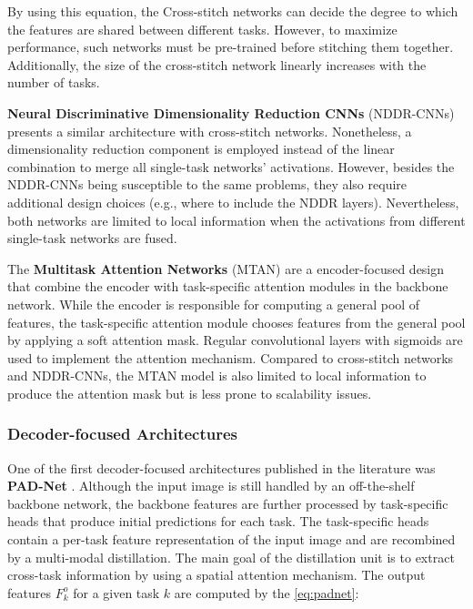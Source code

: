 By using this equation, the Cross-stitch networks can decide the degree to which the features are shared between different tasks. However, to maximize performance, such networks must be pre-trained before stitching them together. Additionally, the size of the cross-stitch network linearly increases with the number of tasks. 

\textbf{Neural Discriminative Dimensionality Reduction CNNs} (NDDR-CNNs) \citep{gao2019nddr} presents a similar architecture with cross-stitch networks. Nonetheless, a dimensionality reduction component is employed instead of the linear combination to merge all single-task networks' activations. However, besides the NDDR-CNNs being susceptible to the same problems, they also require additional design choices (e.g., where to include the NDDR layers). Nevertheless, both networks are limited to local information when the activations from different single-task networks are fused.

The \textbf{Multitask Attention Networks} (MTAN) \citep{liu2019end} are a encoder-focused design that combine the encoder with task-specific attention modules in the backbone network. While the encoder is responsible for computing a general pool of features, the task-specific attention module chooses features from the general pool by applying a soft attention mask. Regular convolutional layers with sigmoids are used to implement the attention mechanism. Compared to cross-stitch networks and NDDR-CNNs, the MTAN model is also limited to local information to produce the attention mask but is less prone to scalability issues.

\subsubsection{Decoder-focused Architectures}

One of the first decoder-focused architectures published in the literature was \textbf{PAD-Net} \citep{xu2018pad}. Although the input image is still handled by an off-the-shelf backbone network, the backbone features are further processed by task-specific heads that produce initial predictions for each task. The task-specific heads contain a per-task feature representation of the input image and are recombined by a multi-modal distillation. The main goal of the distillation unit is to extract cross-task information by using a spatial attention mechanism. The output features $F_k^o$ for a given task $k$ are computed by the \autoref{eq:padnet}:

